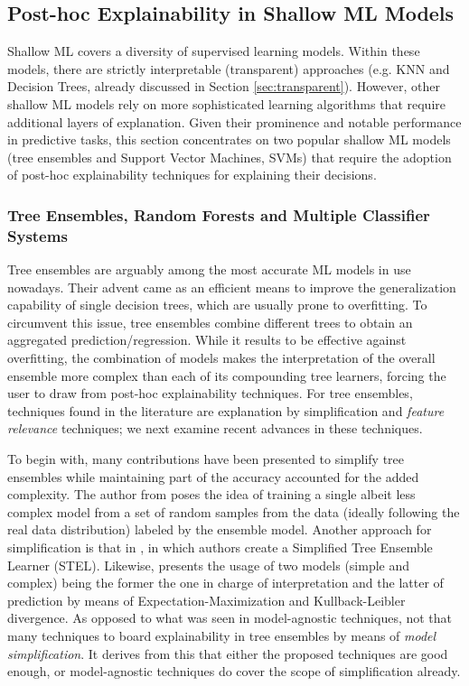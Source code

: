 \documentclass[final]{elsarticle}
\begin{document}
\subsection{Post-hoc Explainability in Shallow ML Models} \label{ssec:shallow-posthoc}

Shallow ML covers a diversity of supervised learning models. Within these models, there are strictly interpretable (transparent) approaches (e.g. KNN and Decision Trees, already discussed in Section \ref{sec:transparent}). However, other shallow ML models rely on more sophisticated learning algorithms that require additional layers of explanation. Given their prominence and notable performance in predictive tasks, this section concentrates on two popular shallow ML models (tree ensembles and Support Vector Machines, SVMs) that require the adoption of post-hoc explainability techniques for explaining their decisions.

\subsubsection{Tree Ensembles, Random Forests and Multiple Classifier Systems}

Tree ensembles are arguably among the most accurate ML models in use nowadays. Their advent came as an efficient means to improve the generalization capability of single decision trees, which are usually prone to overfitting. To circumvent this issue, tree ensembles combine different trees to obtain an aggregated prediction/regression. While it results to be effective against overfitting, the combination of models makes the interpretation of the overall ensemble more complex than each of its compounding tree learners, forcing the user to draw from post-hoc explainability techniques. For tree ensembles, techniques found in the literature are explanation by simplification and \textit{feature relevance} techniques; we next examine recent advances in these techniques. 

To begin with, many contributions have been presented to simplify tree ensembles while maintaining part of the accuracy accounted for the added complexity. The author from \cite{domingos1998knowledge} poses the idea of training a single albeit less complex model from a set of random samples from the data (ideally following the real data distribution) labeled by the ensemble model. Another approach for simplification is that in \cite{Intrees}, in which authors create a Simplified Tree Ensemble Learner (STEL). Likewise, \cite{MakingTEInterpretable} presents the usage of two models (simple and complex) being the former the one in charge of interpretation and the latter of prediction by means of Expectation-Maximization and Kullback-Leibler divergence. As opposed to what was seen in model-agnostic techniques, not that many techniques to board explainability in tree ensembles by means of \textit{model simplification}. It derives from this that either the proposed techniques are good enough, or model-agnostic techniques do cover the scope of simplification already. 
\end{document}
